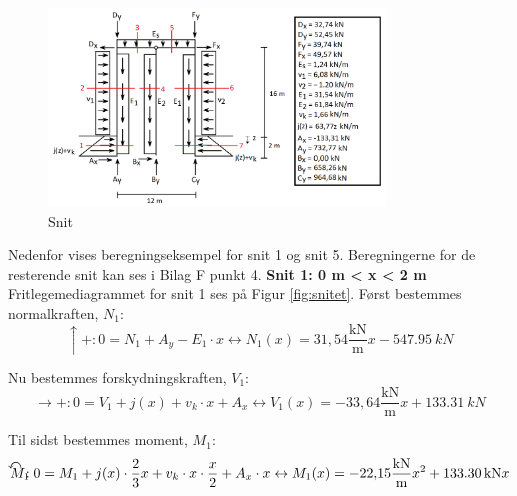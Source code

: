 \begin{figure}[H]
	\centering
	\includegraphics[width=0.8\textwidth]{billeder/snitbrud.png}
	\caption{Snit}
	\label{fig:snitbrud}
\end{figure}

Nedenfor vises beregningseksempel for snit 1 og snit 5. Beregningerne for de resterende snit kan ses i Bilag F punkt 4. 
\newline
\newline
\textbf{Snit 1: 0 m < x < 2 m}
\newline
Fritlegemediagrammet for snit 1 ses på Figur \ref{fig:snitet}.
\newline
\newline
Først bestemmes normalkraften, $N_1$:
\begin{equation}
	\uparrow+: 0 = N_1 + A_y - E_1 \cdot x \leftrightarrow N_1(x) = 31,\!54 \frac{\text{kN}}{\text{m}} x - \SI{547,95}{kN}
\end{equation}

Nu bestemmes forskydningskraften, $V_1$:
\begin{equation}
	\rightarrow+: 0 = V_1 + j(x) + v_k \cdot x + A_x \leftrightarrow V_1(x) = -33,\!64\frac{\text{kN}}{\text{m}} x + \SI{133,31}{kN}
\end{equation}

Til sidst bestemmes moment, $M_1$:
\begin{equation}
	\ALN{\text{$M_1$}} : 0 = M_1 + j(x) \cdot \frac{2}{3} x + v_k \cdot x \cdot \frac{x}{2} + A_x \cdot x \leftrightarrow M_1(x) = -22,\!15\frac{\text{kN}}{\text{m}} x^2 + \SI{133,30}{kN} x
\end{equation}

